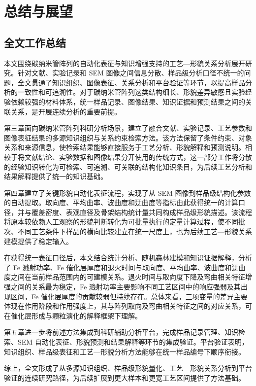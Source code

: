 \chapter{总结与展望}

\section{全文工作总结}

本文围绕碳纳米管阵列的自动化表征与知识增强支持的工艺—形貌关系分析展开研究。针对文献、实验记录和 SEM 图像之间信息分散、样品级分析口径不统一的问题，全文贯通了知识组织、图像表征、关系分析和平台验证等环节，以提高样品分析的一致性和可追溯性。对于碳纳米管阵列这类结构细长、形貌差异敏感且实验经验依赖较强的材料体系，统一样品记录、图像结果、知识证据和预测结果之间的关联关系，是开展连续分析的重要前提。

第三章面向碳纳米管阵列科研分析场景，建立了融合文献、实验记录、工艺参数和图像表征结果的多源知识组织与关系约束检索方法。该方法保留了条件约束、对象关系和来源信息，使检索结果能够直接服务于工艺分析、形貌解释和预测说明。相较于将文献结论、实验数据和图像结果分开使用的传统方式，这一部分工作将分散的经验知识转化为可检索、可追溯、可关联的结构化知识条目，为后续工艺分析和结果解释提供了统一的知识基础。

第四章建立了关键形貌自动化表征流程，实现了从 SEM 图像到样品级结构化参数的自动提取。取向度、平均曲率、波曲度和迂曲度等指标由此获得统一的计算口径，并与覆盖密度、表观直径及骨架结构统计量共同构成样品级形貌描述。该流程将原本较依赖人工观察的形貌判断转化为可批量执行的定量计算过程，使不同批次、不同工艺条件下样品的横向比较建立在统一尺度上，也为后续工艺—形貌关系建模提供了稳定输入。

在获得统一表征口径后，本文结合统计分析、随机森林建模和知识证据解释，分析了 Fe 溅射功率、Fe 催化层厚度和退火时间与取向度、平均曲率、波曲度和迂曲度之间在当前样品范围内的可建模关系。退火时间与取向度下降及弯曲相关特征增强之间的关系最为稳定，Fe 溅射功率主要影响不同工艺区间中的响应强弱及其出现区间，Fe 催化层厚度的贡献较弱但持续存在。总体来看，三项变量的差异主要体现在作用阶段和作用强度上，其与阵列取向及弯曲相关特征之间的对应关系，可在催化层形成与颗粒演化的解释框架下理解。

第五章进一步将前述方法集成到科研辅助分析平台，完成样品记录管理、知识检索、SEM 自动化表征、形貌预测和结果解释等环节的集成验证。平台验证表明，知识组织、样品级表征和工艺—形貌分析方法能够在统一样品编号下顺序衔接。

综上，全文形成了从多源知识组织、样品级形貌量化、工艺—形貌关系分析到平台验证的连续研究路径，为后续扩展到更大样本和更宽工艺区间提供了方法基础。

